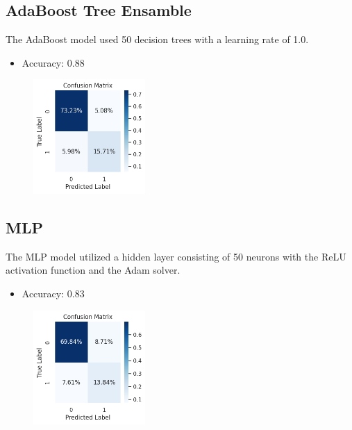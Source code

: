 \documentclass{article}
\begin{document}
\subsection{AdaBoost Tree Ensamble}\label{subsec:adaboost}
The AdaBoost model used 50 decision trees with a learning rate of 1.0.
\begin{itemize}
\item Accuracy: 0.88
\end{itemize}
\begin{figure}[h!]    
    \includegraphics[width=0.38\textwidth]{adaboost_cm.png}    
    \label{fig:adaboost_cm}
\end{figure}

\newpage

\subsection{MLP}\label{subsec:mlp}
The MLP model utilized a hidden layer consisting of 50 neurons with the ReLU activation function and the Adam solver.
\begin{itemize}
\item Accuracy: 0.83
\end{itemize}
\begin{figure}[h!]    
    \includegraphics[width=0.38\textwidth]{mlp_cm.png}    
    \label{fig:mlp_cm}
\end{figure}
\end{document}
